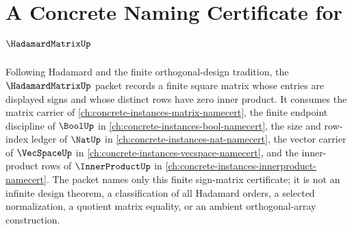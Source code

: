 \chapter{A Concrete Naming Certificate for $\HadamardMatrixUp$}
\label{ch:concrete-instances-hadamard-matrix-namecert}

Following Hadamard and the finite orthogonal-design tradition, the $\HadamardMatrixUp$ packet records a finite square matrix whose entries are displayed signs and whose distinct rows have zero inner product. It consumes the matrix carrier of \autoref{ch:concrete-instances-matrix-namecert}, the finite endpoint discipline of $\BoolUp$ in \autoref{ch:concrete-instances-bool-namecert}, the size and row-index ledger of $\NatUp$ in \autoref{ch:concrete-instances-nat-namecert}, the vector carrier of $\VecSpaceUp$ in \autoref{ch:concrete-instances-vecspace-namecert}, and the inner-product rows of $\InnerProductUp$ in \autoref{ch:concrete-instances-innerproduct-namecert}. The packet names only this finite sign-matrix certificate; it is not an infinite design theorem, a classification of all Hadamard orders, a selected normalization, a quotient matrix equality, or an ambient orthogonal-array construction.

